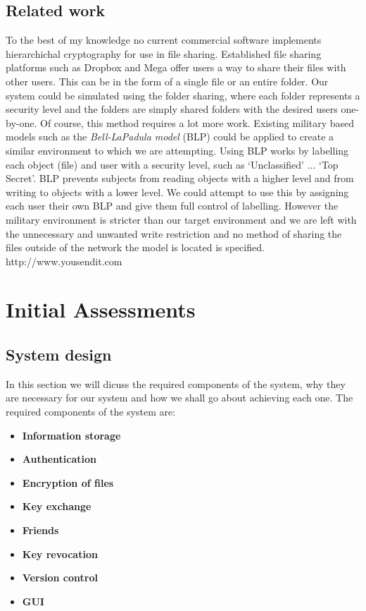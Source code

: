 \documentclass[12pt, titlepage]{article}
\begin{document}
\subsection{Related work}
To the best of my knowledge no current commercial software implements hierarchichal cryptography for use in file sharing.
\newline \indent Established file sharing platforms such as Dropbox and Mega offer users a way to share their files with other users. This can be in the form of a single file or an entire folder. Our system could be simulated using the folder sharing, where each folder represents a security level and the folders are simply shared folders with the desired users one-by-one. Of course, this method requires a lot more work.
\newline \indent Existing military based models such as the \textit{Bell-LaPadula model} (BLP) could be applied to create a similar environment to which we are attempting. Using BLP works by labelling each object (file) and user with a security level, such as `Unclassified' ... `Top Secret'. BLP prevents subjects from reading objects with a higher level and from writing to objects with a lower level. We could attempt to use this by assigning each user their own BLP and give them full control of labelling. However the military environment is stricter than our target environment and we are left with the unnecessary and unwanted write restriction and no method of sharing the files outside of the network the model is located is specified.
\newline http://www.yousendit.com

\section{Initial Assessments}

\subsection{System design}
In this section we will dicuss the required components of the system, why they are necessary for our system and how we shall go about achieving each one. The required components of the system are:
\begin{itemize}
	\item \textbf{Information storage}
	\item \textbf{Authentication}
	\item \textbf{Encryption of files}
	\item \textbf{Key exchange}
	\item \textbf{Friends}
	\item \textbf{Key revocation}
	\item \textbf{Version control}
	\item \textbf{GUI}
\end{itemize}
\end{document}
